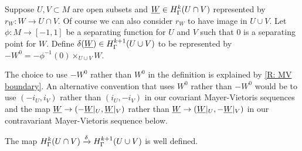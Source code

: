 \begin{definition}
Suppose $U,V\subset M$ are open subsets and $\underline{W}\in H^k_\Gamma(U\cap V)$ represented by $r_W \colon W \to U\cap V$. Of course we can also consider $r_W$ to have image in $U\cup V$. Let $\phi:M\to [-1,1]$ be a separating function for $U$ and $V$ such that $0$ is a separating point for $W$.
Define $\delta(\underline{W})\in H^{k+1}_\Gamma(U\cup V)$ to be represented by $-W^0=-\phi^{-1}(0)\times_{U\cup V}W$.
\end{definition}

The choice to use $-W^0$ rather than $W^0$ in the definition is explained by \cref{R: MV boundary}. An alternative convention that uses $W^0$ rather than $-W^0$ would be to use $(-i_U,i_V)$ rather than $(i_U,-i_V)$ in our covariant Mayer-Vietoris sequences and the map $\underline{W}\to (-\underline{W}|_U, \underline{W}|_V)$ rather than $\underline{W}\to (\underline{W}|_U, -\underline{W}|_V)$ in our contravariant Mayer-Vietoris sequence below.



\begin{proposition}\label{P: connecting}
The map $H^k_\Gamma(U\cap V)\xrightarrow{\delta} H^{k+1}_\Gamma(U\cup V)$ is well defined.
\end{proposition}

